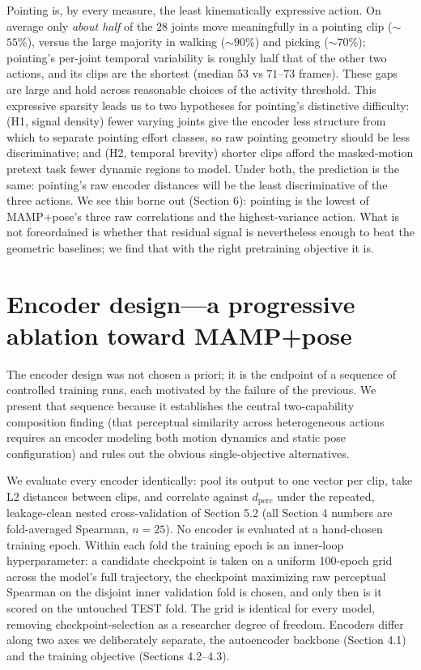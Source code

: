 \documentclass[letterpaper]{article} %
\begin{document}
{Pointing is, by every measure, the least kinematically expressive action.} On average only
\emph{about half} of the $28$ joints move meaningfully in a pointing clip ($\sim$$55\%$), versus
the large majority in walking ($\sim$$90\%$) and picking ($\sim$$70\%$); pointing's per-joint
temporal variability is roughly {half} that of the other two actions, and its clips are the
shortest (median $53$ vs $71$--$73$ frames). These gaps are large and hold across reasonable
choices of the activity threshold.
This expressive sparsity leads us to two hypotheses for pointing's distinctive difficulty:
{(H1, signal density)} fewer varying joints give the encoder less structure from which to
separate pointing effort classes, so raw pointing geometry should be less discriminative; and
{(H2, temporal brevity)} shorter clips afford the masked-motion pretext task fewer dynamic
regions to model. Under both, the prediction is the same: pointing's {raw} encoder distances
will be the least discriminative of the three actions. We see this borne out (Section 6): pointing
is the lowest of MAMP+pose's three raw correlations and the highest-variance action. What is not
foreordained is whether that residual signal is nevertheless enough to beat the geometric
baselines; we find that with the right pretraining objective it is.

\section{Encoder design---a progressive ablation toward MAMP+pose}
The encoder design was not chosen a priori; it is the endpoint of a sequence of controlled
training runs, each motivated by the failure of the previous. We present that sequence because it
establishes the central {two-capability composition} finding (that perceptual similarity
across heterogeneous actions requires an encoder modeling {both} motion dynamics and static
pose configuration) and rules out the obvious single-objective alternatives.

We evaluate every encoder identically: pool its output to one vector per clip, take L2 distances
between clips, and correlate against $d_{\text{perc}}$ under the repeated, leakage-clean nested
cross-validation of Section 5.2 (all Section 4 numbers are fold-averaged Spearman, $n=25$).
{No encoder is evaluated at a hand-chosen training epoch.} Within each fold the training
epoch is an inner-loop hyperparameter: a candidate checkpoint is taken on a {uniform
100-epoch grid across the model's full trajectory}, the checkpoint maximizing raw perceptual
Spearman on the disjoint inner validation fold is chosen, and only then is it scored on the
untouched TEST fold. The grid is identical for every model, removing checkpoint-selection as a
researcher degree of freedom. Encoders differ along two axes we deliberately separate, the
{autoencoder backbone} (Section 4.1) and the {training objective} (Sections
4.2--4.3).
\end{document}
